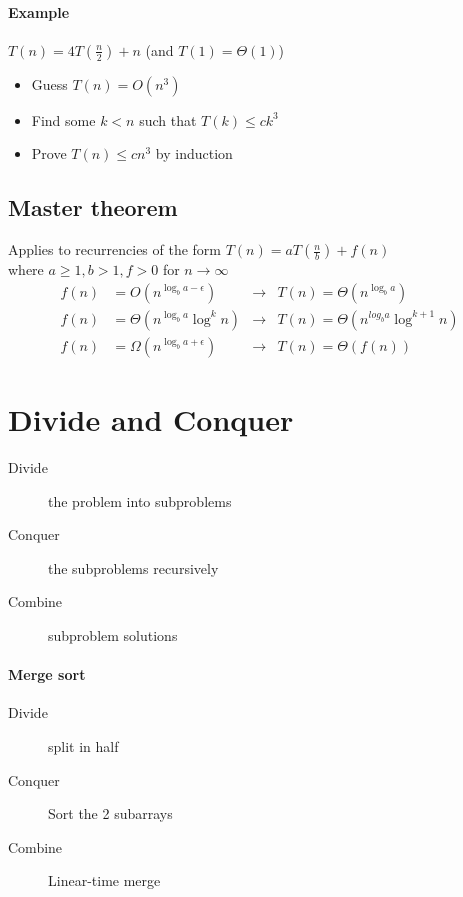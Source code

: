 \documentclass{article}
\begin{document}
\paragraph{Example}
$T(n)=4T\left(\frac{n}{2}\right)+n$	(and $T(1)=\Theta(1)$)\\
\begin{itemize}
\item Guess $T(n)=O(n^3)$
\item Find some $k<n$ such that $T(k)\leq ck^3$
\item Prove $T(n)\leq cn^3$ by induction
\end{itemize}

\subsection{Master theorem}
Applies to recurrencies of the form $T(n)=aT\left(\frac{n}{b}\right)+f(n)$\\ where $a\geq 1, b>1, f>0$ for $n \rightarrow \infty$
\begin{align*}
f(n)		&=O	(n^{\log_b a - \epsilon})		&\rightarrow& 	T(n)= \Theta(n^{\log_b a})\\
f(n)		&=	\Theta(n^{\log_b a}\log^k n)		&\rightarrow& 	T(n)=\Theta(n^{log_b a} \log^{k+1} n)\\
f(n)		&=	\Omega(n^{\log_b a + \epsilon}) 	&\rightarrow& 	T(n)=\Theta(f(n))
\end{align*}

\section{Divide and Conquer}
\begin{description}
\item[Divide] the problem into subproblems
\item[Conquer] the subproblems recursively
\item[Combine] subproblem solutions
\end{description}

\paragraph{Merge sort}
\begin{description}
\item[Divide] split in half
\item[Conquer] Sort the 2 subarrays
\item[Combine] Linear-time merge
\end{description}
\end{document}
